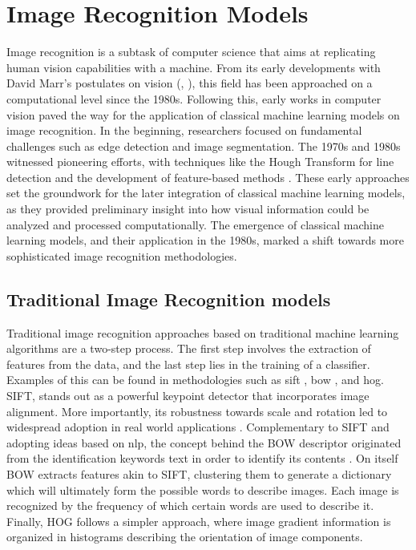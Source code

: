 \section{Image Recognition Models}
\label{rel:sec_imrecon}
Image recognition is a subtask of computer science that aims at replicating human vision 
capabilities with a machine. From its early developments  with David Marr's postulates 
on vision (\cite{poggio1981marr}, \cite{marr2010vision}), this field has been approached on a 
computational level since the 1980s. Following this, early works in computer vision 
paved the way for the application of classical machine learning models on image recognition. In 
the beginning, researchers focused on fundamental challenges such as edge detection and image 
segmentation. The 1970s and 1980s witnessed pioneering efforts, with 
techniques like the Hough Transform for line detection and the development of feature-based 
methods \autocite{duda1972use}. These early approaches set the groundwork for the later integration 
of classical machine learning models, as they provided preliminary insight into how visual 
information could be analyzed and processed computationally. The emergence of classical machine 
learning models, and their application in the 1980s, marked a shift towards more sophisticated 
image recognition methodologies.\\

\subsection{Traditional Image Recognition models}
\noindent Traditional image recognition approaches based on traditional machine learning 
algorithms are a two-step process. The first step involves the extraction of features from the 
data, and the last step lies in the training of a classifier. Examples of this 
can be found in methodologies such as \gls{sift} \autocite{lowe1999object}, \gls{bow} 
\autocite{csurka2004visual}, and \gls{hog}. 
SIFT, stands out as a powerful keypoint detector that incorporates image alignment. 
More importantly, its robustness towards scale and rotation led to widespread adoption in real 
world applications \autocite{cruz2012scale}.
Complementary to SIFT and adopting ideas based on \gls{nlp}, the concept behind the BOW descriptor 
originated from the identification keywords text in order to identify its contents 
\autocite{harris1954distributional}. On itself BOW extracts features akin to SIFT, clustering them 
to generate a dictionary which will ultimately form the possible words to describe images. Each 
image is recognized by the frequency of which certain words are used to describe it.
Finally, HOG follows a simpler approach, where image gradient information is organized in histograms 
describing the orientation of image components. \\ 

